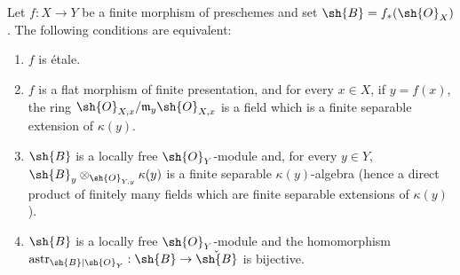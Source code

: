 \begin{proposition}[18.2.3]
\label{IV.18.2.3}
Let $f:X\to Y$ be a finite morphism of preschemes and set $\sh{B}=f_*(\sh{O}_X)$.
The following conditions are equivalent:
\begin{enumerate}[label=\emph{\alph*)}]
  \item $f$ is \'etale.
  \item[a$'$)] $f$ is a flat morphism of finite presentation, and for every $x\in X$, if $y=f(x)$, the ring $\sh{O}_{X,x}/\mathfrak{m}_y\sh{O}_{X,x}$ is a field which is a finite separable extension of $\kappa(y)$.
  \item $\sh{B}$ is a locally free $\sh{O}_Y$-module and, for every $y\in Y$, $\sh{B}_y\otimes_{\sh{O}_{Y,y}}\kappa(y)$ is a finite separable $\kappa(y)$-algebra (hence a direct product of finitely many fields which are finite separable extensions of $\kappa(y)$).
  \item $\sh{B}$ is a locally free $\sh{O}_Y$-module and the homomorphism $\operatorname{astr}_{\sh{B}|\sh{O}_Y}:\sh{B}\to\check{\sh{B}}$  is bijective.
\end{enumerate}
\end{proposition}

